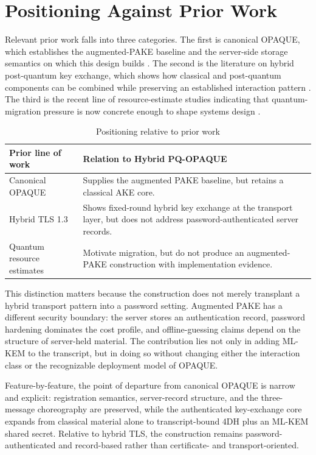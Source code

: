 \documentclass[conference]{IEEEtran}
\begin{document}
\section{Positioning Against Prior Work}

Relevant prior work falls into three categories. The first is canonical OPAQUE, which establishes the augmented-PAKE baseline and the server-side storage semantics on which this design builds \cite{jarecki2018,ietf-opaque}. The second is the literature on hybrid post-quantum key exchange, which shows how classical and post-quantum components can be combined while preserving an established interaction pattern \cite{tlshybrid2025}. The third is the recent line of resource-estimate studies indicating that quantum-migration pressure is now concrete enough to shape systems design \cite{babbush2026}.

\begin{table}[t]
\caption{Positioning relative to prior work}
\label{tab:acit-positioning}
\centering
\footnotesize
\begin{tabularx}{\columnwidth}{@{}L{2.4cm}Y@{}}
\toprule
Prior line of work & Relation to Hybrid PQ-OPAQUE \\
\midrule
Canonical OPAQUE & Supplies the augmented PAKE baseline, but retains a classical AKE core. \\
Hybrid TLS 1.3 & Shows fixed-round hybrid key exchange at the transport layer, but does not address password-authenticated server records. \\
Quantum resource estimates & Motivate migration, but do not produce an augmented-PAKE construction with implementation evidence. \\
\bottomrule
\end{tabularx}
\end{table}

This distinction matters because the construction does not merely transplant a hybrid transport pattern into a password setting. Augmented PAKE has a different security boundary: the server stores an authentication record, password hardening dominates the cost profile, and offline-guessing claims depend on the structure of server-held material. The contribution lies not only in adding ML-KEM to the transcript, but in doing so without changing either the interaction class or the recognizable deployment model of OPAQUE.

Feature-by-feature, the point of departure from canonical OPAQUE is narrow and explicit: registration semantics, server-record structure, and the three-message choreography are preserved, while the authenticated key-exchange core expands from classical material alone to transcript-bound 4DH plus an ML-KEM shared secret. Relative to hybrid TLS, the construction remains password-authenticated and record-based rather than certificate- and transport-oriented.
\end{document}
